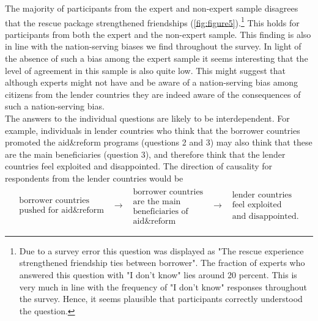 The majority of participants from the expert and non-expert sample disagrees that 
the rescue package strengthened friendships (\autoref{fig:figure5}).\footnote{Due to a survey error this question was displayed as "The rescue experience strengthened friendship ties between borrower". The fraction of experts who answered this question with "I don't know" lies around 20 percent. This is very much in line with the frequency of "I don't know" responses throughout the survey. Hence, it seems plausible that participants correctly understood the question. } This holds for participants from 
both the expert and the non-expert sample. This finding is also in line with the nation-serving biases
we find throughout the survey. In light of the absence of such a bias among the expert sample 
it seems interesting that the level of agreement in this sample is also quite low. 
This might suggest that although experts might not have and be aware of a nation-serving bias
among citizens from the lender countries they are indeed aware of the consequences of such 
a nation-serving bias. 
\\
The answers to the individual questions are likely to
be interdependent. For example, individuals in lender countries who
think that the borrower countries promoted the aid\&reform programs
(questions 2 and 3) may also think that these are the main beneficiaries
(question 3), and therefore think that the lender countries feel exploited
and disappointed. The direction of causality for respondents from the lender
countries would be%
\begin{equation*}
\begin{array}{ccccc}
\begin{array}{c}
\text{borrower countries} \\ 
\text{pushed for aid\&reform}%
\end{array}
& \rightarrow  & 
\begin{array}{c}
\text{borrower countries} \\ 
\text{are the main} \\ 
\text{beneficiaries of} \\ 
\text{aid\&reform}%
\end{array}
& \rightarrow  & 
\begin{array}{c}
\text{lender countries} \\ 
\text{feel exploited} \\ 
\text{and disappointed.}%
\end{array}%
\end{array}%
\end{equation*}


